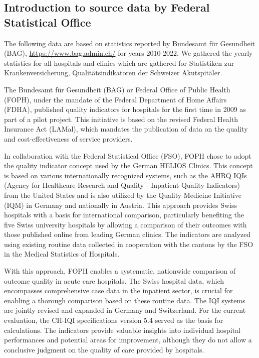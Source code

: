 \subsection{Introduction to source data by Federal Statistical Office}
The following data are based on statistics reported by Bundesamt für Gesundheit (BAG), \url{https://www.bag.admin.ch/} for years 2010-2022. 
We gathered the yearly statistics for all hospitals and clinics which are gathered for
Statistiken zur Krankenversicherung, Qualitätsindikatoren der Schweizer Akutspitäler.

The Bundesamt für Gesundheit (BAG) or Federal Office of Public Health (FOPH), under the mandate of the Federal Department of Home Affairs (FDHA), published quality indicators for hospitals for the first time in 2009 as part of a pilot project. This initiative is based on the revised Federal Health Insurance Act (LAMal), which mandates the publication of data on the quality and cost-effectiveness of service providers.

In collaboration with the Federal Statistical Office (FSO), FOPH chose to adopt the quality indicator concept used by the German HELIOS Clinics. This concept is based on various internationally recognized systems, such as the AHRQ IQIs (Agency for Healthcare Research and Quality - Inpatient Quality Indicators) from the United States and is also utilized by the Quality Medicine Initiative (IQM) in Germany and nationally in Austria. This approach provides Swiss hospitals with a basis for international comparison, particularly benefiting the five Swiss university hospitals by allowing a comparison of their outcomes with those published online from leading German clinics. The indicators are analyzed using existing routine data collected in cooperation with the cantons by the FSO in the Medical Statistics of Hospitals.

With this approach, FOPH enables a systematic, nationwide comparison of outcome quality in acute care hospitals. The Swiss hospital data, which encompasses comprehensive case data in the inpatient sector, is crucial for enabling a thorough comparison based on these routine data. The IQI systems are jointly revised and expanded in Germany and Switzerland. For the current evaluation, the CH-IQI specifications version 5.4 served as the basis for calculations. The indicators provide valuable insights into individual hospital performances and potential areas for improvement, although they do not allow a conclusive judgment on the quality of care provided by hospitals.








